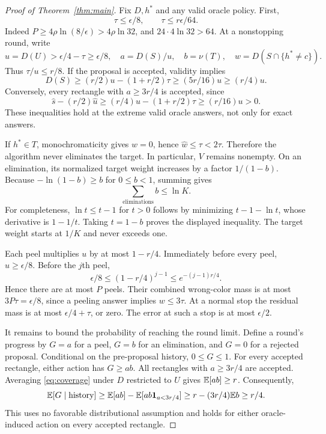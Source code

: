 \begin{proof}[Proof of Theorem~\ref{thm:main}]
Fix $D,h^*$ and any valid oracle policy. First,
\begin{equation}\label{eq:tau-small}
 \tau\le\epsilon/8,\qquad \tau\le r\epsilon/64.
\end{equation}
Indeed $P\ge4\rho\ln(8/\epsilon)>4\rho\ln32$, and $24\cdot4\ln32>64$. At a nonstopping round, write
\[
 u=D(U)>\epsilon/4-\tau\ge\epsilon/8,
 \quad a=D(S)/u,\quad b=\nu(T),\quad w=D(S\cap\{h^*\ne c\}).
\]
Thus $\tau/u\le r/8$. If the proposal is accepted, validity implies
\[
 D(S)\ge(r/2)u-(1+r/2)\tau\ge(5r/16)u\ge(r/4)u.
\]
Conversely, every rectangle with $a\ge3r/4$ is accepted, since
\[
 \widehat s-(r/2)\widehat u
 \ge(r/4)u-(1+r/2)\tau\ge(r/16)u>0.
\]
These inequalities hold at the extreme valid oracle answers, not only for exact answers.

If $h^*\in T$, monochromaticity gives $w=0$, hence $\widehat w\le\tau<2\tau$. Therefore the algorithm never eliminates the target. In particular, $V$ remains nonempty. On an elimination, its normalized target weight increases by a factor $1/(1-b)$. Because $-\ln(1-b)\ge b$ for $0\le b<1$, summing gives
\begin{equation}\label{eq:elim-budget}
 \sum_{\text{eliminations}} b\le\ln K.
\end{equation}
For completeness, $\ln t\le t-1$ for $t>0$ follows by minimizing $t-1-\ln t$, whose derivative is $1-1/t$. Taking $t=1-b$ proves the displayed inequality. The target weight starts at $1/K$ and never exceeds one.

Each peel multiplies $u$ by at most $1-r/4$. Immediately before every peel, $u\ge\epsilon/8$. Before the $j$th peel,
\[
 \epsilon/8\le(1-r/4)^{j-1}\le e^{-(j-1)r/4}.
\]
Hence there are at most $P$ peels. Their combined wrong-color mass is at most $3P\tau=\epsilon/8$, since a peeling answer implies $w\le3\tau$. At a normal stop the residual mass is at most $\epsilon/4+\tau$, or zero. The error at such a stop is at most $\epsilon/2$.

It remains to bound the probability of reaching the round limit. Define a round's progress by $G=a$ for a peel, $G=b$ for an elimination, and $G=0$ for a rejected proposal. Conditional on the pre-proposal history, $0\le G\le1$. For every accepted rectangle, either action has $G\ge ab$. All rectangles with $a\ge3r/4$ are accepted. Averaging \eqref{eq:coverage} under $D$ restricted to $U$ gives $\mathbb E[ab]\ge r$. Consequently,
\begin{equation}\label{eq:drift}
 \mathbb E[G\mid\text{history}]
 \ge \mathbb E[ab]-\mathbb E[ab\mathbf 1_{a<3r/4}]
 \ge r-(3r/4)\mathbb E b\ge r/4.
\end{equation}
This uses no favorable distributional assumption and holds for either oracle-induced action on every accepted rectangle.


\end{proof}
